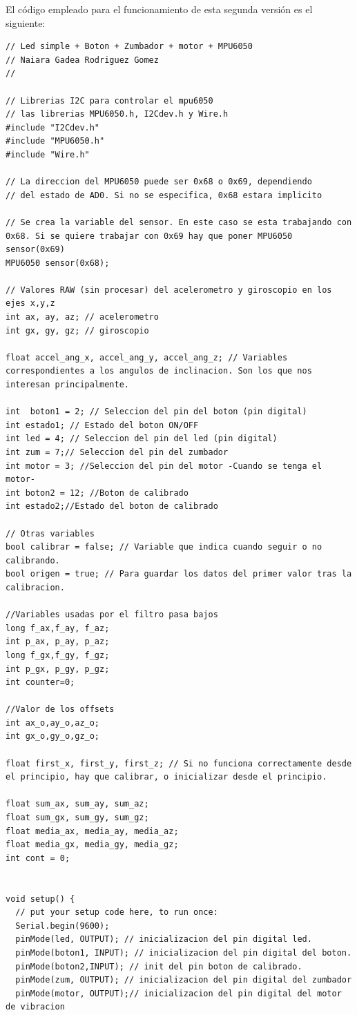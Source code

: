 \newpage
El código empleado para el funcionamiento de esta segunda versión es el siguiente:
\begin{lstlisting}
// Led simple + Boton + Zumbador + motor + MPU6050
// Naiara Gadea Rodriguez Gomez
// 

// Librerias I2C para controlar el mpu6050 
// las librerias MPU6050.h, I2Cdev.h y Wire.h 
#include "I2Cdev.h" 
#include "MPU6050.h" 
#include "Wire.h" 

// La direccion del MPU6050 puede ser 0x68 o 0x69, dependiendo  
// del estado de AD0. Si no se especifica, 0x68 estara implicito 

// Se crea la variable del sensor. En este caso se esta trabajando con 0x68. Si se quiere trabajar con 0x69 hay que poner MPU6050 sensor(0x69) 
MPU6050 sensor(0x68); 

// Valores RAW (sin procesar) del acelerometro y giroscopio en los ejes x,y,z 
int ax, ay, az; // acelerometro 
int gx, gy, gz; // giroscopio 

float accel_ang_x, accel_ang_y, accel_ang_z; // Variables correspondientes a los angulos de inclinacion. Son los que nos interesan principalmente.

int  boton1 = 2; // Seleccion del pin del boton (pin digital)
int estado1; // Estado del boton ON/OFF
int led = 4; // Seleccion del pin del led (pin digital)
int zum = 7;// Seleccion del pin del zumbador
int motor = 3; //Seleccion del pin del motor -Cuando se tenga el motor-
int boton2 = 12; //Boton de calibrado
int estado2;//Estado del boton de calibrado

// Otras variables
bool calibrar = false; // Variable que indica cuando seguir o no calibrando.
bool origen = true; // Para guardar los datos del primer valor tras la calibracion.

//Variables usadas por el filtro pasa bajos 
long f_ax,f_ay, f_az; 
int p_ax, p_ay, p_az; 
long f_gx,f_gy, f_gz; 
int p_gx, p_gy, p_gz; 
int counter=0;

//Valor de los offsets 
int ax_o,ay_o,az_o; 
int gx_o,gy_o,gz_o; 

float first_x, first_y, first_z; // Si no funciona correctamente desde el principio, hay que calibrar, o inicializar desde el principio.

float sum_ax, sum_ay, sum_az;
float sum_gx, sum_gy, sum_gz;
float media_ax, media_ay, media_az;
float media_gx, media_gy, media_gz;
int cont = 0;


void setup() {
  // put your setup code here, to run once:
  Serial.begin(9600);
  pinMode(led, OUTPUT); // inicializacion del pin digital led.
  pinMode(boton1, INPUT); // inicializacion del pin digital del boton.
  pinMode(boton2,INPUT); // init del pin boton de calibrado.
  pinMode(zum, OUTPUT); // inicializacion del pin digital del zumbador
  pinMode(motor, OUTPUT);// inicializacion del pin digital del motor de vibracion


\end{lstlisting}
